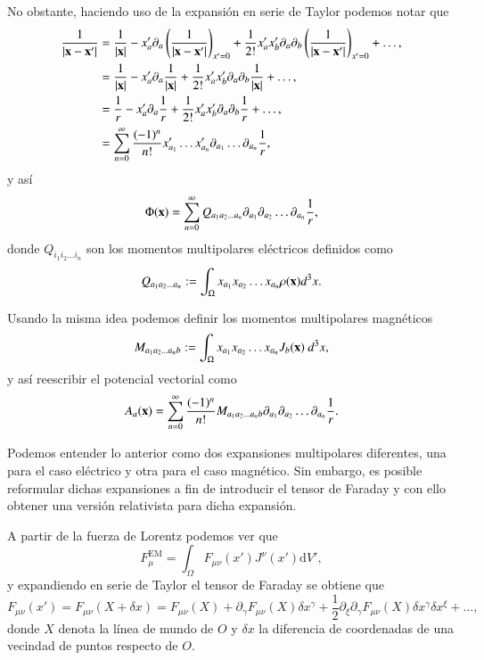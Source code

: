 No obstante, haciendo uso de la expansión en serie de Taylor podemos notar que
\begin{align}
\frac{1}{|\vb{x} - \vb{x}'|} &= \frac{1}{|\vb{x}|} - x'_a \partial_a \left( \frac{1}{|\vb{x} - \vb{x}'|} \right)_{x'=0} + \frac{1}{2!} x'_a x'_b \partial_a \partial_b \left( \frac{1}{|\vb{x} - \vb{x}'|} \right)_{x'=0} + \dots,\\
&= \frac{1}{|\vb{x}|} - x'_a \partial_a \frac{1}{|\vb{x}|} + \frac{1}{2!} x'_a x'_b \partial_a \partial_b \frac{1}{|\vb{x}|} + \dots,\\
&= \frac{1}{r}  - x'_a \partial_a \frac{1}{r} + \frac{1}{2!} x'_a x'_b \partial_a \partial_b \frac{1}{r} + \dots,\\
&= \sum_{n=0}^{\infty} \frac{(-1)^n}{n!} x'_{a_1} \dots x'_{a_n} \partial_{a_1} \dots \partial_{a_n} \frac{1}{r},
\end{align}
y así
\begin{equation}
\Phi(\vb{x}) = \sum_{n=0}^{\infty} Q_{a_1 a_2 \dots a_n} \partial_{a_1} \partial_{a_2} \dots \partial_{a_n} \frac{1}{r},
\end{equation}
donde $Q_{i_1 i_2 \dots i_n}$ son los momentos multipolares eléctricos definidos como
\begin{equation}
Q_{a_1 a_2 \dots a_n} := \int_{\Omega} x_{a_1} x_{a_2} \dots x_{a_n} \rho(\vb{x}) d^3x.
\end{equation}

Usando la misma idea podemos definir los momentos multipolares magnéticos
\begin{equation}
M_{a_1 a_2 \dots a_n b} := \int_{\Omega} x_{a_1} x_{a_2} \dots x_{a_n} J_b(\vb{x}) \  d^3x,
\end{equation}
y así reescribir el potencial vectorial como
\begin{equation}
A_a(\vb{x}) = \sum_{n=0}^{\infty} \frac{(-1)^n}{n!} M_{a_1 a_2 \dots a_n b} \partial_{a_1} \partial_{a_2} \dots \partial_{a_n} \frac{1}{r}.
\end{equation}

Podemos entender lo anterior como dos expansiones multipolares diferentes, una para el caso eléctrico y otra para el caso magnético. Sin embargo, es posible reformular dichas expansiones a fin de introducir el tensor de Faraday y con ello obtener una versión relativista para dicha expansión.

A partir de la fuerza de Lorentz podemos ver que
\begin{equation}
\label{eq:106}
F^{\mathrm{EM}}_{\mu} = \int_{\Omega} F_{\mu \nu}(x') J^{\nu}(x') \mathrm{d}V',
\end{equation}
y expandiendo en serie de Taylor el tensor de Faraday se obtiene que
\begin{equation}
\label{eq:107}
F_{\mu \nu}(x') = F_{\mu \nu}(X + \delta x) = F_{\mu \nu}(X) +  \partial_{\gamma} F_{\mu \nu}(X) \delta x^{\gamma} +  \frac{1}{2} \partial_{\xi} \partial_{\gamma} F_{\mu \nu}(X) \delta x^{\gamma} \delta x^{\xi} + \dots,
\end{equation}
donde $X$ denota la línea de mundo de $O$ y $\delta x$ la diferencia de coordenadas de una vecindad de puntos respecto de $O$. 

